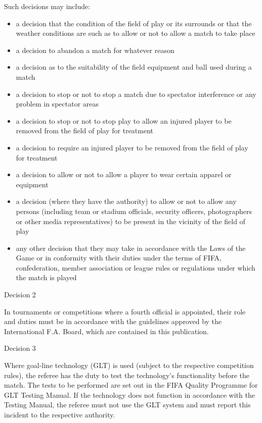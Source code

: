 \bigskip

Such decisions may include:

\begin{itemize}
\item a decision that the condition of the field of play or its surrounds or that the weather conditions are such as to allow or not to allow a match to take place
\item a decision to abandon a match for whatever reason
\item a decision as to the suitability of the field equipment and ball used during a match
\item a decision to stop or not to stop a match due to spectator interference or any problem in spectator areas 
\item a decision to stop or not to stop play to allow an injured player to be removed from the field of play for treatment 
\item a decision to require an injured player to be removed from the field of play for treatment 
\item a decision to allow or not to allow a player to wear certain apparel or equipment 
\item a decision (where they have the authority) to allow or not to allow any persons (including team or stadium officials, security officers, photographers or other media representatives) to be present in the vicinity of the field of play 
\item any other decision that they may take in accordance with the Laws of the Game or in conformity with their duties under the terms of FIFA, confederation, member association or league rules or regulations under which the match is played 
\end{itemize}

\bigskip

Decision 2

In tournaments or competitions where a fourth official is appointed, their role and duties must be in accordance with the guidelines approved by the International F.A. Board, which are contained in this publication.

\bigskip

Decision 3

Where goal-line technology (GLT) is used (subject to the respective competition rules), the referee has the duty to test the technology's functionality before the match. The tests to be performed are set out in the FIFA Quality Programme for GLT Testing Manual. If the technology does not function in accordance with the Testing Manual, the referee must not use the GLT system and must report this incident to the respective authority. 
